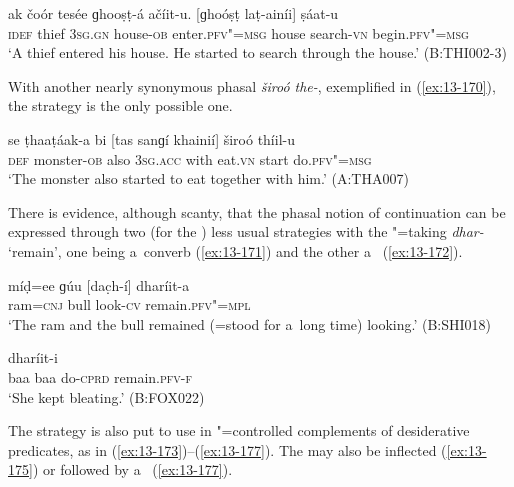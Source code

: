 \begin{exe}
\ex
\label{ex:13-169}
\gll ak čoór tesée ɡhooṣṭ-á ačíit-u. [ɡhoóṣṭ  laṭ-ainíi] ṣáat-u \\
\textsc{idef} thief \textsc{3sg.gn} house-\textsc{ob} enter.\textsc{pfv"=msg} house search-\textsc{vn} begin.\textsc{pfv"=msg} \\
\glt `A thief entered his house. He started to search through the house.' (B:THI002-3) 
\end{exe}

With another nearly synonymous phasal  \textit{široó the-}, exemplified in (\ref{ex:13-170}), the  strategy is the only possible one.

\begin{exe}
\ex
\label{ex:13-170}
\gll se ṭhaaṭáak-a bi [tas sanɡí khainií]  široó thíil-u \\
\textsc{def} monster-\textsc{ob} also \textsc{3sg.acc} with eat.\textsc{vn} start do.\textsc{pfv"=msg} \\
\glt `The monster also started to eat together with him.' (A:THA007) 
\end{exe}

There is evidence, although scanty, that the phasal notion of continuation can be expressed through two (for the ) less usual strategies with the "=taking  \textit{dhar-} `remain', one being a~converb (\ref{ex:13-171}) and the other a~ (\ref{ex:13-172}).

\begin{exe}
\ex
\label{ex:13-171}
\gll míḍ=ee ɡúu [dac̣h-í] dharíit-a \\
ram=\textsc{cnj} bull look-\textsc{cv} remain.\textsc{pfv"=mpl} \\
\glt `The ram and the bull remained (=stood for a~long time) looking.' (B:SHI018)

\ex
\label{ex:13-172}
 dharíit-i  \\
baa baa do-\textsc{cprd} remain.\textsc{pfv-f} \\
\glt `She kept bleating.' (B:FOX022) 
\end{exe}

 The  strategy is also put to use in
"=controlled complements of desiderative predicates, as in
(\ref{ex:13-173})--(\ref{ex:13-177}). The  may also be inflected
(\ref{ex:13-175}) or followed by
a~ (\ref{ex:13-177}).

